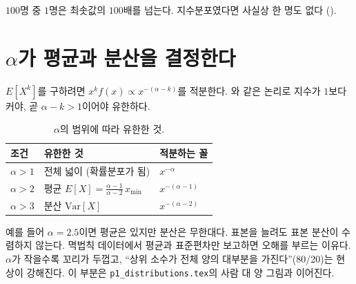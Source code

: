 \documentclass[11pt]{article}
\begin{document}
$100$명 중 $1$명은 최솟값의 $100$배를 넘는다. 지수분포였다면 사실상 한 명도 없다
().

\section{$\alpha$가 평균과 분산을 결정한다}
\label{sec:moments}

$E[X^k]$를 구하려면 $x^k f(x) \propto x^{-(\alpha-k)}$를 적분한다.
와 같은 논리로 지수가 $1$보다 커야, 곧 $\alpha - k > 1$이어야 유한하다.

\begin{table}[H]
  \centering
  \caption{$\alpha$의 범위에 따라 유한한 것.}
  \label{tab:moments}
  \begin{tabular}{lll}
    \toprule
    조건 & 유한한 것 & 적분하는 꼴 \\
    \midrule
    $\alpha > 1$ & 전체 넓이 (확률분포가 됨) & $x^{-\alpha}$ \\
    \midrule
    $\alpha > 2$ & 평균 $E[X] = \frac{\alpha-1}{\alpha-2}\,x_{\min}$ & $x^{-(\alpha-1)}$ \\
    \midrule
    $\alpha > 3$ & 분산 $\mathrm{Var}[X]$ & $x^{-(\alpha-2)}$ \\
    \bottomrule
  \end{tabular}
\end{table}

예를 들어 $\alpha = 2.5$이면 평균은 있지만 분산은 무한대다. 표본을 늘려도 표본 분산이
수렴하지 않는다. 멱법칙 데이터에서 평균과 표준편차만 보고하면 오해를 부르는 이유다.
$\alpha$가 작을수록 꼬리가 두껍고, ``상위 소수가 전체 양의 대부분을 가진다''(80/20)는
현상이 강해진다. 이 부분은 \texttt{p1\_distributions.tex}의 사람 대 양 그림과 이어진다.
\end{document}
